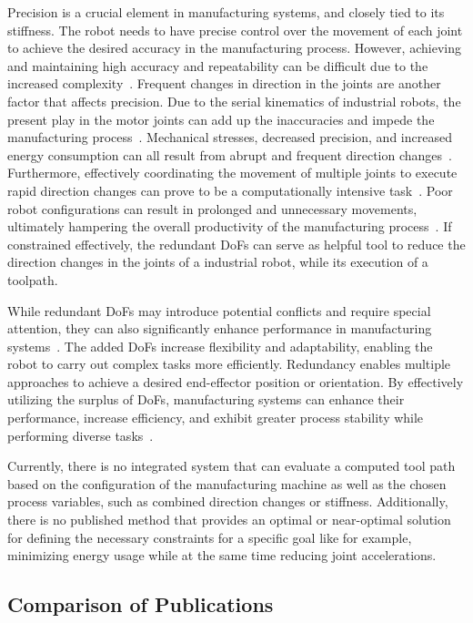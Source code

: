 \documentclass[conference]{IEEEtran}
\begin{document}
Precision is a crucial element in manufacturing systems, and closely tied to its stiffness. The robot needs to have precise control over the movement of each joint to achieve the desired accuracy in the manufacturing process. However, achieving and maintaining high accuracy and repeatability can be difficult due to the increased complexity~\cite{Duong.2021}. Frequent changes in direction in the joints are another factor that affects precision. Due to the serial kinematics of industrial robots, the present play in the motor joints can add up the inaccuracies and impede the manufacturing process~\cite{Huynh.2020, ChenGang.2014}. Mechanical stresses, decreased precision, and increased energy consumption can all result from abrupt and frequent direction changes~\cite{Gasparetto.2010}. Furthermore, effectively coordinating the movement of multiple joints to execute rapid direction changes can prove to be a computationally intensive task~\cite{VandeWeghe.2007}. Poor robot configurations can result in prolonged and unnecessary movements, ultimately hampering the overall productivity of the manufacturing process~\cite{Reiter.2016}. 
If constrained effectively, the redundant DoFs can serve as helpful tool to reduce the direction changes in the joints of a industrial robot, while its execution of a toolpath. 

While redundant DoFs may introduce potential conflicts and require special attention, they can also significantly enhance performance in manufacturing systems~\cite{Ayten.2016}. The added DoFs increase flexibility and adaptability, enabling the robot to carry out complex tasks more efficiently. Redundancy enables multiple approaches to achieve a desired end-effector position or orientation. By effectively utilizing the surplus of DoFs, manufacturing systems can enhance their performance, increase efficiency, and exhibit greater process stability while performing diverse tasks~\cite{Boscariol.2020}. 

Currently, there is no integrated system that can evaluate a computed tool path based on the configuration of the manufacturing machine as well as the chosen process variables, such as combined direction changes or stiffness.
Additionally, there is no published method that provides an optimal or near-optimal solution for defining the necessary constraints for a specific goal like for example, minimizing energy usage while at the same time reducing joint accelerations.

\subsection{Comparison of Publications}
\end{document}
